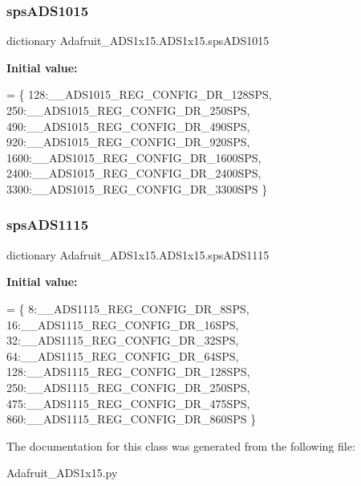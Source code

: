 \subsubsection{\texorpdfstring{sps\+A\+D\+S1015}{spsADS1015}}
{\footnotesize\ttfamily dictionary Adafruit\+\_\+\+A\+D\+S1x15.\+A\+D\+S1x15.\+sps\+A\+D\+S1015\hspace{0.3cm}{\ttfamily [static]}}

{\bfseries Initial value\+:}
\begin{DoxyCode}
=  \{
    128:\_\_ADS1015\_REG\_CONFIG\_DR\_128SPS,
    250:\_\_ADS1015\_REG\_CONFIG\_DR\_250SPS,
    490:\_\_ADS1015\_REG\_CONFIG\_DR\_490SPS,
    920:\_\_ADS1015\_REG\_CONFIG\_DR\_920SPS,
    1600:\_\_ADS1015\_REG\_CONFIG\_DR\_1600SPS,
    2400:\_\_ADS1015\_REG\_CONFIG\_DR\_2400SPS,
    3300:\_\_ADS1015\_REG\_CONFIG\_DR\_3300SPS
  \}
\end{DoxyCode}
\mbox{\label{classAdafruit__ADS1x15_1_1ADS1x15_a81cf4149d432e3ff6dee510a91ee7996}} 
\subsubsection{\texorpdfstring{sps\+A\+D\+S1115}{spsADS1115}}
{\footnotesize\ttfamily dictionary Adafruit\+\_\+\+A\+D\+S1x15.\+A\+D\+S1x15.\+sps\+A\+D\+S1115\hspace{0.3cm}{\ttfamily [static]}}

{\bfseries Initial value\+:}
\begin{DoxyCode}
=  \{
    8:\_\_ADS1115\_REG\_CONFIG\_DR\_8SPS,
    16:\_\_ADS1115\_REG\_CONFIG\_DR\_16SPS,
    32:\_\_ADS1115\_REG\_CONFIG\_DR\_32SPS,
    64:\_\_ADS1115\_REG\_CONFIG\_DR\_64SPS,
    128:\_\_ADS1115\_REG\_CONFIG\_DR\_128SPS,
    250:\_\_ADS1115\_REG\_CONFIG\_DR\_250SPS,
    475:\_\_ADS1115\_REG\_CONFIG\_DR\_475SPS,
    860:\_\_ADS1115\_REG\_CONFIG\_DR\_860SPS
  \}
\end{DoxyCode}


The documentation for this class was generated from the following file\+:\begin{DoxyCompactItemize}
\item 
Adafruit\+\_\+\+A\+D\+S1x15.\+py\end{DoxyCompactItemize}

